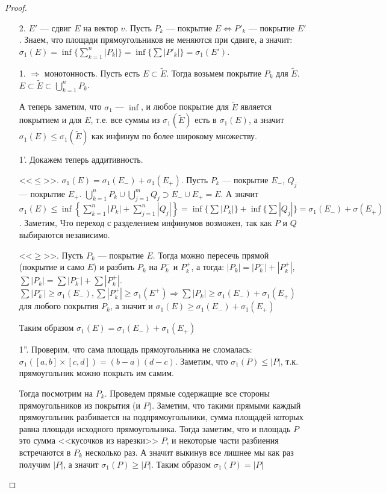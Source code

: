 \begin{proof}
    \slashn
    \begin{enumerate}
        \item[2.] $E'$ --- сдвиг  $E$ на вектор  $v$. Пусть  $P_k$ --- покрытие  $E \iff P'_k$ --- покрытие  $E'$. Знаем, что площади прямоугольников не меняются при сдвиге, а значит:
            $\sigma_1(E) = \inf\{\sum\limits_{k=1}^n|P_k|\} = \inf\{\sum |P'_k|\} = \sigma_1(E')$.
        \item[1.] $\Rightarrow$ монотонность. Пусть есть  $E \subset \widetilde{E}$. Тогда возьмем покрытие  $P_k$ для  $\widetilde{E}$.  $E \subset \widetilde{E} \subset \bigcup\limits_{k=1}^n P_k$. 

		А теперь заметим, что $\sigma_1$ ---  $\inf$, и любое покрытие для $\widetilde{E}$ является покрытием и для $E$, т.е. все суммы из $\sigma_1(\widetilde{E})$ есть в $\sigma_1(E)$, а значит $\sigma_1(E) \le \sigma_1(\widetilde{E})$ как инфинум по более широкому множеству. 

        \item[1'.] Докажем теперь аддитивность. 

            <<$\le$>>. $\sigma_1(E) = \sigma_1(E_-) + \sigma_1(E_+)$. Пусть $P_k$ --- покрытие  $E_-$,  $Q_j$ --- покрытие  $E_+$.  $\bigcup\limits_{k=1}^n P_k \cup \bigcup\limits_{j=1}^m Q_j \supset E_- \cup E_+ = E$. А значит  $\sigma_1(E) \le \inf \left\{ \sum\limits_{k=1}^n |P_k| + \sum\limits_{j=1}^n |Q_j|\right\} = \inf\{\sum |P_k|\} + \inf\{\sum |Q_j|\} = \sigma_1(E_-) + \sigma(E_+)$. Заметим, Что переход с разделением инфинумов  возможен, так как $P$ и  $Q$ выбираются независимо.

	    <<$\ge$>>. Пусть $P_k$ --- покрытие  $E$. Тогда можно пересечь прямой (покрытие и само $E$) и разбить $P_k$ на $P_k^-$ и $P_k^+$, а тогда: $|P_k| = |P^-_k| + |P^+_k|$,  $\sum |P_k| = \sum |P^-_k| + \sum |P^+_k|$. $\sum |P_k^-| \ge \sigma_1(E_-), \sum |P_k^+| \ge \sigma_1(E^+) \Rightarrow \sum |P_k| \ge \sigma_1(E_-) + \sigma_1(E_+)$ для любого покрытия $P_k$, а значит и $\sigma_1(E) \ge \sigma_1(E_-) + \sigma_1(E_+)$

	    Таким образом $\sigma_1(E) = \sigma_1(E_-) + \sigma_1(E_+)$
        \item[1''.] Проверим, что сама площадь прямоугольника не сломалась: $\sigma_1([a, b] \times [c, d]) = (b-a)(d-c)$. Заметим, что  $\sigma_1(P) \le |P|$, т.к. прямоугольник можно покрыть им самим.

		Тогда посмотрим на $P_k$. Проведем прямые содержащие все стороны прямоугольников из покрытия (и $P$). Заметим, что такими прямыми каждый прямоугольник разбивается на подпрямоугольники, сумма площадей которых равна площади исходного прямоугольника. Тогда заметим, что и площадь $P$ это сумма <<кусочков из нарезки>> $P$, и некоторые части разбиения встречаются в  $P_k$ несколько раз. А значит выкинув все лишнее мы как раз получим  $|P|$, а значит  $\sigma_1(P) \ge |P|$.
		Таким образом $\sigma_1(P) = |P|$
    \end{enumerate}
\end{proof}
